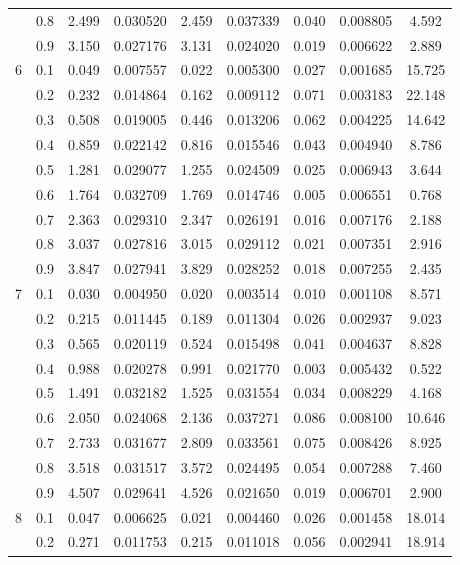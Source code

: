 \begin{longtable}{ | c | c || c | c | c | c | c | c | c | }
 & 0.8 & 2.499 & 0.030520 & 2.459 & 0.037339 & 0.040 & 0.008805 & 4.592 \\
 & 0.9 & 3.150 & 0.027176 & 3.131 & 0.024020 & 0.019 & 0.006622 & 2.889 \\
 \hline
\multirow{9}{*}{6} & 0.1 & 0.049 & 0.007557 & 0.022 & 0.005300 & 0.027 & 0.001685 & 15.725 \\
 & 0.2 & 0.232 & 0.014864 & 0.162 & 0.009112 & 0.071 & 0.003183 & 22.148 \\
 & 0.3 & 0.508 & 0.019005 & 0.446 & 0.013206 & 0.062 & 0.004225 & 14.642 \\
 & 0.4 & 0.859 & 0.022142 & 0.816 & 0.015546 & 0.043 & 0.004940 & 8.786 \\
 & 0.5 & 1.281 & 0.029077 & 1.255 & 0.024509 & 0.025 & 0.006943 & 3.644 \\
 & 0.6 & 1.764 & 0.032709 & 1.769 & 0.014746 & 0.005 & 0.006551 & 0.768 \\
 & 0.7 & 2.363 & 0.029310 & 2.347 & 0.026191 & 0.016 & 0.007176 & 2.188 \\
 & 0.8 & 3.037 & 0.027816 & 3.015 & 0.029112 & 0.021 & 0.007351 & 2.916 \\
 & 0.9 & 3.847 & 0.027941 & 3.829 & 0.028252 & 0.018 & 0.007255 & 2.435 \\
 \hline
\multirow{9}{*}{7} & 0.1 & 0.030 & 0.004950 & 0.020 & 0.003514 & 0.010 & 0.001108 & 8.571 \\
 & 0.2 & 0.215 & 0.011445 & 0.189 & 0.011304 & 0.026 & 0.002937 & 9.023 \\
 & 0.3 & 0.565 & 0.020119 & 0.524 & 0.015498 & 0.041 & 0.004637 & 8.828 \\
 & 0.4 & 0.988 & 0.020278 & 0.991 & 0.021770 & 0.003 & 0.005432 & 0.522 \\
 & 0.5 & 1.491 & 0.032182 & 1.525 & 0.031554 & 0.034 & 0.008229 & 4.168 \\
 & 0.6 & 2.050 & 0.024068 & 2.136 & 0.037271 & 0.086 & 0.008100 & 10.646 \\
 & 0.7 & 2.733 & 0.031677 & 2.809 & 0.033561 & 0.075 & 0.008426 & 8.925 \\
 & 0.8 & 3.518 & 0.031517 & 3.572 & 0.024495 & 0.054 & 0.007288 & 7.460 \\
 & 0.9 & 4.507 & 0.029641 & 4.526 & 0.021650 & 0.019 & 0.006701 & 2.900 \\
 \hline
\multirow{9}{*}{8} & 0.1 & 0.047 & 0.006625 & 0.021 & 0.004460 & 0.026 & 0.001458 & 18.014 \\
 & 0.2 & 0.271 & 0.011753 & 0.215 & 0.011018 & 0.056 & 0.002941 & 18.914 \\

\end{longtable}
